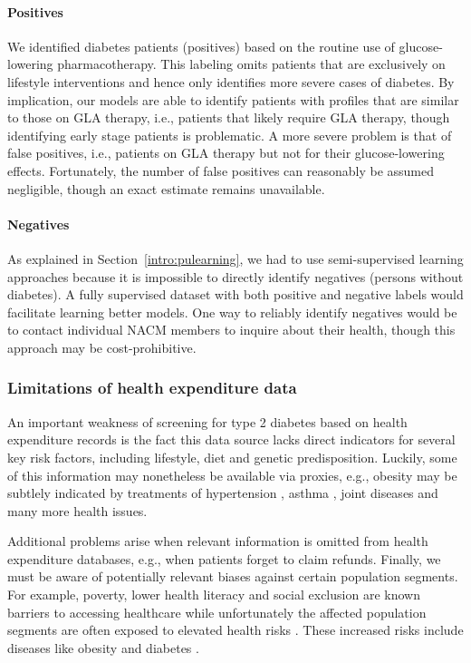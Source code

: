 \paragraph{Positives} We identified diabetes patients (positives) based on the routine use of glucose-lowering pharmacotherapy. This labeling omits patients that are exclusively on lifestyle interventions and hence only identifies more severe cases of diabetes. By implication, our models are able to identify patients with profiles that are similar to those on GLA therapy, i.e., patients that likely require GLA therapy, though identifying early stage patients is problematic. A more severe problem is that of false positives, i.e., patients on GLA therapy but not for their glucose-lowering effects. Fortunately, the number of false positives can reasonably be assumed negligible, though an exact estimate remains unavailable.

\paragraph{Negatives} As explained in Section~\ref{intro:pulearning}, we had to use semi-supervised learning approaches because it is impossible to directly identify negatives (persons without diabetes). A fully supervised dataset with both positive and negative labels would facilitate learning better models. One way to reliably identify negatives would be to contact individual NACM members to inquire about their health, though this approach may be cost-prohibitive.

\subsubsection{Limitations of health expenditure data}
An important weakness of screening for type 2 diabetes based on health expenditure records is the fact this data source lacks direct indicators for several key risk factors, including lifestyle, diet and genetic predisposition. Luckily, some of this information may nonetheless be available via proxies, e.g., obesity may be subtlely indicated by treatments of hypertension \citep{rahmouni2005obesity}, asthma \citep{sin2008obesity, sutherland2008association}, joint diseases \citep{symmons1997blood, cooper2000risk} and many more health issues.

Additional problems arise when relevant information is omitted from health expenditure databases, e.g., when patients forget to claim refunds. Finally, we must be aware of potentially relevant biases against certain population segments. For example, poverty, lower health literacy and social exclusion are known barriers to accessing healthcare \citep{qualityequality, pleis2009summary, world2010poverty, accesstohealth} while unfortunately the affected population segments are often exposed to elevated health risks \citep{qualityequality, marmot2008closing}. These increased risks include diseases like obesity and diabetes \citep{riste2001high}.

